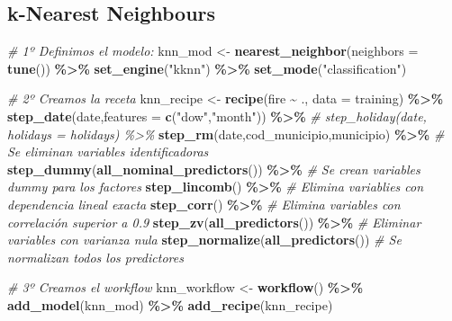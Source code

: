 \documentclass[12pt,a4paper,]{book}
\newenvironment{Shaded}{\begin{snugshade}}{\end{snugshade}}
\newcommand{\AttributeTok}[1]{\textcolor[rgb]{0.13,0.29,0.53}{#1}}
\newcommand{\CommentTok}[1]{\textcolor[rgb]{0.56,0.35,0.01}{\textit{#1}}}
\newcommand{\FunctionTok}[1]{\textcolor[rgb]{0.13,0.29,0.53}{\textbf{#1}}}
\newcommand{\NormalTok}[1]{#1}
\newcommand{\OtherTok}[1]{\textcolor[rgb]{0.56,0.35,0.01}{#1}}
\newcommand{\SpecialCharTok}[1]{\textcolor[rgb]{0.81,0.36,0.00}{\textbf{#1}}}
\newcommand{\StringTok}[1]{\textcolor[rgb]{0.31,0.60,0.02}{#1}}
\newcounter{dummy}
\numberwithin{dummy}{section}
\theoremstyle{ocrenumbox}
\theoremstyle{blacknumex}
\theoremstyle{blacknumbox}
\theoremstyle{ocrenum}
\theoremstyle{ocrenum}
\begin{document}
\hypertarget{k-nearest-neighbours}{%
\subsection{k-Nearest Neighbours}\label{k-nearest-neighbours}}

\begin{Shaded}
\begin{Highlighting}[]
\CommentTok{\# 1º Definimos el modelo:}
\NormalTok{knn\_mod }\OtherTok{\textless{}{-}} 
  \FunctionTok{nearest\_neighbor}\NormalTok{(}\AttributeTok{neighbors =} \FunctionTok{tune}\NormalTok{()) }\SpecialCharTok{\%\textgreater{}\%} 
  \FunctionTok{set\_engine}\NormalTok{(}\StringTok{"kknn"}\NormalTok{) }\SpecialCharTok{\%\textgreater{}\%} 
  \FunctionTok{set\_mode}\NormalTok{(}\StringTok{"classification"}\NormalTok{)  }

\CommentTok{\# 2º Creamos la receta}
\NormalTok{knn\_recipe }\OtherTok{\textless{}{-}} 
  \FunctionTok{recipe}\NormalTok{(fire }\SpecialCharTok{\textasciitilde{}}\NormalTok{ ., }\AttributeTok{data =}\NormalTok{ training) }\SpecialCharTok{\%\textgreater{}\%} 
  \FunctionTok{step\_date}\NormalTok{(date,}\AttributeTok{features =} \FunctionTok{c}\NormalTok{(}\StringTok{"dow"}\NormalTok{,}\StringTok{"month"}\NormalTok{)) }\SpecialCharTok{\%\textgreater{}\%} 
  \CommentTok{\# step\_holiday(date, holidays = holidays) \%\textgreater{}\% }
  \FunctionTok{step\_rm}\NormalTok{(date,cod\_municipio,municipio) }\SpecialCharTok{\%\textgreater{}\%} \CommentTok{\# Se eliminan variables identificadoras}
  \FunctionTok{step\_dummy}\NormalTok{(}\FunctionTok{all\_nominal\_predictors}\NormalTok{()) }\SpecialCharTok{\%\textgreater{}\%} \CommentTok{\# Se crean variables dummy para los factores}
  \FunctionTok{step\_lincomb}\NormalTok{() }\SpecialCharTok{\%\textgreater{}\%} \CommentTok{\# Elimina variablies con dependencia lineal exacta}
  \FunctionTok{step\_corr}\NormalTok{() }\SpecialCharTok{\%\textgreater{}\%} \CommentTok{\# Elimina variables con correlación superior a 0.9}
  \FunctionTok{step\_zv}\NormalTok{(}\FunctionTok{all\_predictors}\NormalTok{()) }\SpecialCharTok{\%\textgreater{}\%} \CommentTok{\# Eliminar variables con varianza nula}
  \FunctionTok{step\_normalize}\NormalTok{(}\FunctionTok{all\_predictors}\NormalTok{()) }\CommentTok{\# Se normalizan todos los predictores}

\CommentTok{\# 3º Creamos el workflow}
\NormalTok{knn\_workflow }\OtherTok{\textless{}{-}} 
  \FunctionTok{workflow}\NormalTok{() }\SpecialCharTok{\%\textgreater{}\%} 
  \FunctionTok{add\_model}\NormalTok{(knn\_mod) }\SpecialCharTok{\%\textgreater{}\%} 
  \FunctionTok{add\_recipe}\NormalTok{(knn\_recipe)}


\end{Highlighting}
\end{Shaded}
\end{document}
